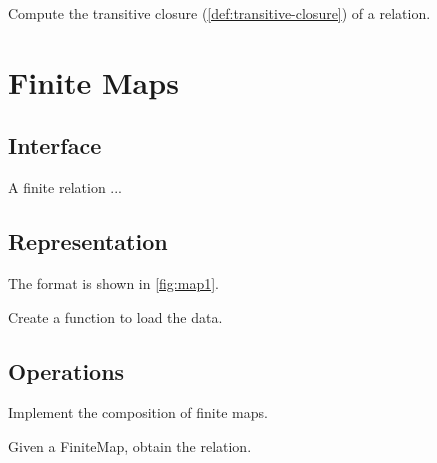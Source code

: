 \begin{gradedexercise}
  Compute the transitive closure (\cref{def:transitive-closure}) of a relation.


\end{gradedexercise}


\section{Finite Maps}

\subsection*{Interface}

A finite relation  ...


\subsection*{Representation}

The format is shown in \cref{fig:map1}.


\begin{gradedexercise}[Representation]
  Create a function to load the data.


%

\end{gradedexercise}

\subsection{Operations}


\begin{gradedexercise}[Composition]
  Implement the composition of finite maps.


%

\end{gradedexercise}


\begin{gradedexercise}
  Given a FiniteMap, obtain the relation.


%

\end{gradedexercise}


